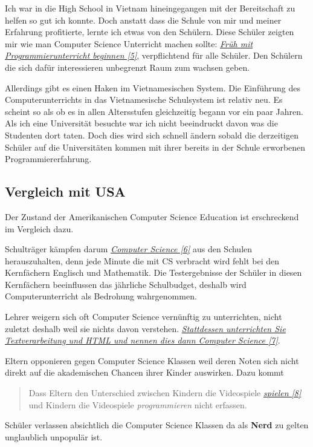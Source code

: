 \documentclass[10pt,a4paper,ngerman,twoside]{article} %
\begin{document}
Ich war in die High School in Vietnam hineingegangen mit der Bereitschaft zu helfen so gut ich konnte. Doch anstatt dass die Schule von mir und meiner Erfahrung profitierte, lernte ich etwas von den Schülern. Diese Schüler zeigten mir wie man Computer Science Unterricht machen sollte: \href{http://neil.fraser.name/news/2012/07/01/}{\textit{Fr\"uh mit Programmierunterricht beginnen [5]}}, verpflichtend für alle Schüler. Den Schülern die sich dafür interessieren unbegrenzt Raum zum wachsen geben.

Allerdings gibt es einen Haken im Vietnamesischen System. Die Einführung des Computerunterrichts in das Vietnamesische Schulsystem ist relativ neu. Es scheint so als ob es in allen Altersstufen gleichzeitig begann vor ein paar Jahren. Als ich eine Universität besuchte war ich nicht beeindruckt davon was die Studenten dort taten. Doch dies wird sich schnell ändern sobald die derzeitigen Schüler auf die Universitäten kommen mit ihrer bereits in der Schule erworbenen Programmiererfahrung.

\subsection*{Vergleich mit USA}
Der Zustand der Amerikanischen Computer Science Education ist erschreckend im Vergleich dazu.

Schulträger kämpfen darum \href{http://www.marylandpublicschools.org/MSDE/programs/esea/docs/TQ_Regulations/core_subjects.htm}{\textit{Computer Science [6]}} aus den Schulen herauszuhalten, denn jede Minute die mit CS verbracht wird fehlt bei den Kernfächern Englisch und Mathematik. Die Testergebnisse der Schüler in diesen Kernfächern beeinflussen das jährliche Schulbudget, deshalb wird Computerunterricht als Bedrohung wahrgenommen.

Lehrer weigern sich oft Computer Science vernünftig zu unterrichten, nicht zuletzt deshalb weil sie nichts davon verstehen.  \href{http://blog.carolynworks.com/?p=572}{\textit{Stattdessen unterrichten Sie Textverarbeitung und HTML und nennen dies dann Computer Science [7]}}.

Eltern opponieren gegen Computer Science Klassen weil deren Noten sich nicht direkt auf die akademischen Chancen ihrer Kinder auswirken. Dazu kommt  
\large 
\begin{quote}
\glqq 
Dass Eltern den Unterschied zwischen Kindern die Videospiele \href{http://www.youtube.com/watch?v=Lql-otlQfNo}{\textit{spielen [8]}} und Kindern die Videospiele \emph{programmieren} nicht erfassen.
\grqq
\end{quote}
\normalsize 
Schüler verlassen absichtlich die Computer Science Klassen da als \textbf{Nerd} zu gelten unglaublich unpopulär ist.
\end{document}
